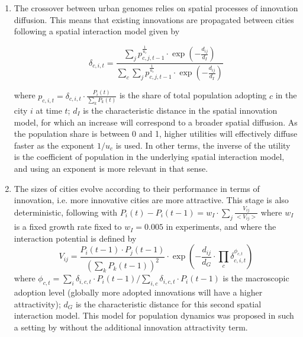 \documentclass[letterpaper]{article}
\begin{document}
\begin{enumerate}
	\item The crossover between urban genomes relies on spatial processes of innovation diffusion. This means that existing innovations are propagated between cities following a spatial interaction model given by

\begin{equation}
\delta_{c,i,t} = \frac{\sum_j p_{c,j,t-1}^{\frac{1}{u_c}} \cdot \exp{(-\frac{d_{ij}}{d_I})}}{\sum_c \sum_j p_{c,j,t-1}^{\frac{1}{u_c}} \cdot \exp{(-\frac{d_{ij}}{d_I})}}
\end{equation}

where $p_{c,i,t} = \delta_{c,i,t} \cdot \frac{P_{i}(t)}{\sum_k P_k (t)}$ is the share of total population adopting $c$ in the city $i$ at time $t$; $d_I$ is the characteristic distance in the spatial innovation model, for which an increase will correspond to a broader spatial diffusion. As the population share is between 0 and 1, higher utilities will effectively diffuse faster as the exponent $1/u_c$ is used. In other terms, the inverse of the utility is the coefficient of population in the underlying spatial interaction model, and using an exponent is more relevant in that sense.


	\item The sizes of cities evolve according to their performance in terms of innovation, i.e. more innovative cities are more attractive. This stage is also deterministic, following  with $P_i(t) - P_i(t-1) = w_I\cdot \sum_j \frac{V_{ij}}{<V_{ij}>}$ where $w_I$ is a fixed growth rate fixed to $w_I = 0.005$ in experiments, and where the interaction potential is defined by
\begin{equation}
V_{ij}= \frac{P_{i}(t-1) \cdot P_{j}(t-1)}{(\sum_k P_k(t-1))^2} \cdot \exp{\left(-\frac{d_{ij}}{d_G} \cdot \prod_c \delta_{c,i,t}^{\phi_{c,t}}\right)}
\end{equation}
where $\phi_{c,t} = \sum_i \delta_{i,c,t}\cdot P_i(t-1) /\sum_{i,c} \delta_{i,c,t}\cdot P_{i}(t-1)$ is the macroscopic adoption level (globally more adopted innovations will have a higher attractivity); $d_G$ is the characteristic distance for this second spatial interaction model. This model for population dynamics was proposed in such a setting by \citep{raimbault2020indirect} without the additional innovation attractivity term.


\end{enumerate}
\end{document}
